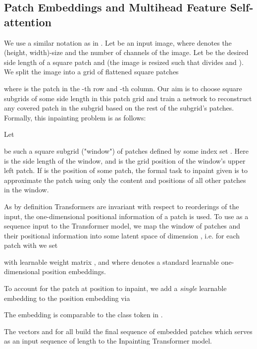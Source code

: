 \documentclass[runningheads]{llncs}
\begin{document}
\subsection{Patch Embeddings and Multihead Feature Self-attention}
\label{seq:embedding_patches}

We use a similar notation as in \cite{dosovitskiy2020}. Let  be an input image, where  denotes the (height, width)-size and  the number of channels of the image. Let  be the desired side length of a square patch and  (the image is resized such that  divides  and ). We split the image  into a  grid of flattened square patches

where  is the patch in the -th row and -th column. Our aim is to choose square subgrids of some side length  in this patch grid and train a network to reconstruct any covered patch in the subgrid based on the rest of the subgrid's patches. Formally, this inpainting problem is as follows:

Let

be such a square subgrid ("window") of patches defined by some index set . Here  is the side length of the window, and  is the grid position of the window's upper left patch. If  is the position of some patch, the formal task to inpaint  given  is to approximate the patch  using only the content and positions of all other patches  in the window.

As by definition Transformers are invariant with respect to reorderings of the input, the one-dimensional positional information  of a patch  is used.
To use as a sequence input to the Transformer model, we map the window of patches and their positional information into some latent space of dimension , i.e. for each patch  with  we set


with learnable weight matrix , and where  denotes a standard learnable one-dimensional position embeddings.

To account for the patch at position  to inpaint, we add a {\em single} learnable embedding  to the position embedding via

The embedding  is comparable to the class token in \cite{devlin2019bert}.

The vectors  and  for all  build the final sequence of embedded patches which serves as an input sequence of length  to the Inpainting Transformer model.
\end{document}
